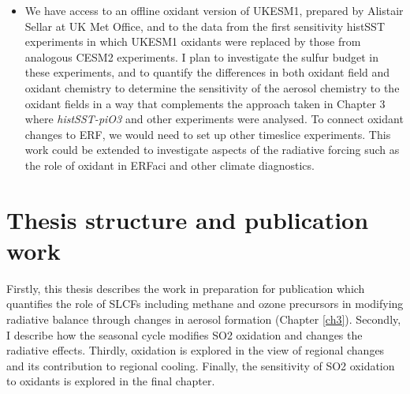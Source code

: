 \begin{enumerate}
    \begin{itemize}
        \item  We have access to an offline oxidant version of UKESM1, prepared by Alistair Sellar at UK Met Office, and to the data from the first sensitivity histSST experiments in which UKESM1 oxidants were replaced by those from analogous CESM2 experiments.  I plan to investigate the sulfur budget in these experiments, and to quantify the differences in both oxidant field and oxidant chemistry to determine the sensitivity of the aerosol chemistry to the oxidant fields in a way that complements the approach taken in Chapter 3 where \textit{histSST-piO3} and other experiments were analysed. To connect oxidant changes to ERF, we would need to set up other timeslice experiments. This work could be extended to investigate aspects of the radiative forcing such as the role of oxidant in ERFaci and other climate diagnostics. 
    \end{itemize}
    
\end{enumerate}

\section{Thesis structure and publication work}

Firstly, this thesis describes the work in preparation for publication which quantifies the role of SLCFs including methane and ozone precursors in modifying radiative balance through changes in aerosol formation (Chapter \ref{ch3}). Secondly, I describe how the seasonal cycle modifies SO2 oxidation and changes the radiative effects. Thirdly, oxidation is explored in the view of regional changes and its contribution to regional cooling. Finally, the sensitivity of SO2 oxidation to oxidants is explored in the final chapter.